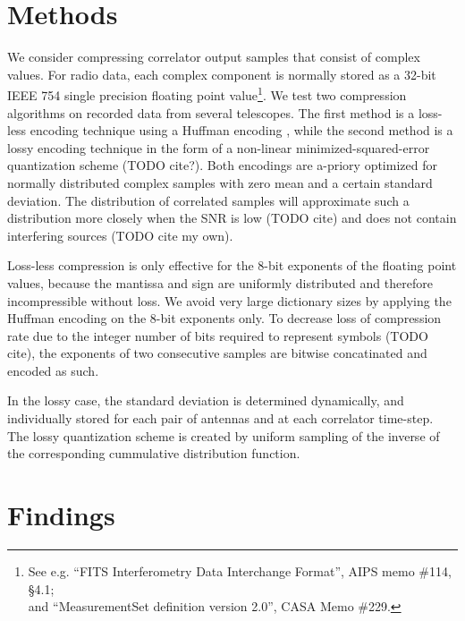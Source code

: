 \documentclass{article}
\begin{document}

\section{Methods}
We consider compressing correlator output samples that consist of complex values. For radio data, each complex component is normally stored as a 32-bit IEEE 754 single precision floating point value\footnote{See e.g. ``FITS Interferometry Data Interchange Format'', AIPS memo \#114, \S4.1;\\and ``MeasurementSet definition version 2.0'', CASA Memo \#229.}. We test two compression algorithms on recorded data from several telescopes. The first method is a loss-less encoding technique using a Huffman encoding \cite{huffman}, while the second method is a lossy encoding technique in the form of a non-linear minimized-squared-error quantization scheme (TODO cite?). Both encodings are a-priory optimized for normally distributed complex samples with zero mean and a certain standard deviation. The distribution of correlated samples will approximate such a distribution more closely when the SNR is low (TODO cite) and does not contain interfering sources (TODO cite my own).

Loss-less compression is only effective for the 8-bit exponents of the floating point values, because the mantissa and sign are uniformly distributed and therefore incompressible without loss. We avoid very large dictionary sizes by applying the Huffman encoding on the 8-bit exponents only. To decrease loss of compression rate due to the integer number of bits required to represent symbols (TODO cite), the exponents of two consecutive samples are bitwise concatinated and encoded as such.

In the lossy case, the standard deviation is determined dynamically, and individually stored for each pair of antennas and at each correlator time-step. The lossy quantization scheme is created by uniform sampling of the inverse of the corresponding cummulative distribution function.

\section{Findings}
\end{document}
